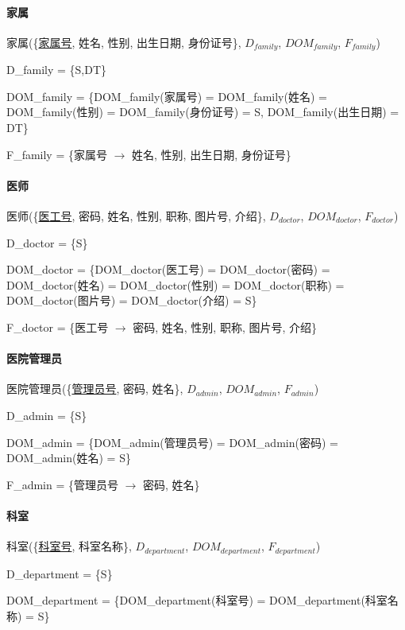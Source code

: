 \documentclass{article}
\begin{document}
\paragraph{家属}

家属(\{\underline{家属号}, 姓名, 性别, 出生日期, 身份证号\}, $D_{family}$, $DOM_{family}$, $F_{family}$)

D\_family = \{S,DT\}

DOM\_family = \{DOM\_family(家属号) = DOM\_family(姓名) = DOM\_family(性别) = DOM\_family(身份证号) = S, DOM\_family(出生日期) = DT\}

F\_family = \{家属号 $\rightarrow$ 姓名, 性别, 出生日期, 身份证号\}

\paragraph{医师}

医师(\{\underline{医工号}, 密码, 姓名, 性别, 职称, 图片号, 介绍\}, $D_{doctor}$, $DOM_{doctor}$, $F_{doctor}$)

D\_doctor = \{S\}

DOM\_doctor = \{DOM\_doctor(医工号) = DOM\_doctor(密码) = DOM\_doctor(姓名) = \newline DOM\_doctor(性别) = DOM\_doctor(职称) = DOM\_doctor(图片号) = DOM\_doctor(介绍) = S\}

F\_doctor = \{医工号 $\rightarrow$ 密码, 姓名, 性别, 职称, 图片号, 介绍\}

\paragraph{医院管理员}

医院管理员(\{\underline{管理员号}, 密码, 姓名\}, $D_{admin}$, $DOM_{admin}$, $F_{admin}$)

D\_admin = \{S\}

DOM\_admin = \{DOM\_admin(管理员号) = DOM\_admin(密码) = DOM\_admin(姓名) = S\}

F\_admin = \{管理员号 $\rightarrow$ 密码, 姓名\}

\paragraph{科室}

科室(\{\underline{科室号}, 科室名称\}, $D_{department}$, $DOM_{department}$, $F_{department}$)

D\_department = \{S\}

DOM\_department = \{DOM\_department(科室号) = DOM\_department(科室名称) = S\}
\end{document}
